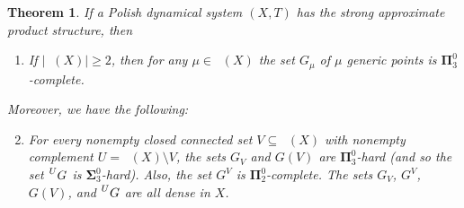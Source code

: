 \documentclass{amsart}
\newtheorem{thm}{Theorem}
\theoremstyle{definition}
\newcommand{\bP}{\boldsymbol{\Pi}}
\newcommand{\bS}{\boldsymbol{\Sigma}}
\DeclareMathOperator{\MT}{\mathcal{M}_{\mathit T} }
\begin{document}
\begin{thm} \label{thm:main}
If a Polish dynamical system $(X,T)$ has the strong approximate product structure,
then

\begin{enumerate}
\item \label{main1}
If $|\MT(X)|\geq 2$, then
for any $\mu \in \MT(X)$
the set $G_\mu$ of $\mu$ generic points is $\bP^0_3$-complete.
\end{enumerate}
Moreover, we have the following:
\begin{enumerate} \setcounter{enumi}{1}
\item \label{main2}
For every nonempty closed connected set $V\subseteq \MT(X)$ with nonempty
complement $U=\MT(X)\setminus V$, the sets $G_V$ and $G(V)$ are $\bP_3^0$-hard
(and so the  set $\prescript{U}{}G$ is $\bS_3^0$-hard).
Also, the set $G^V$ is $\bP^0_2$-complete.
The sets $G_V$, $G^V$, $G(V)$, and $\prescript{U}{}G$ are all dense in $X$.
\end{enumerate}
\end{thm}
\end{document}

